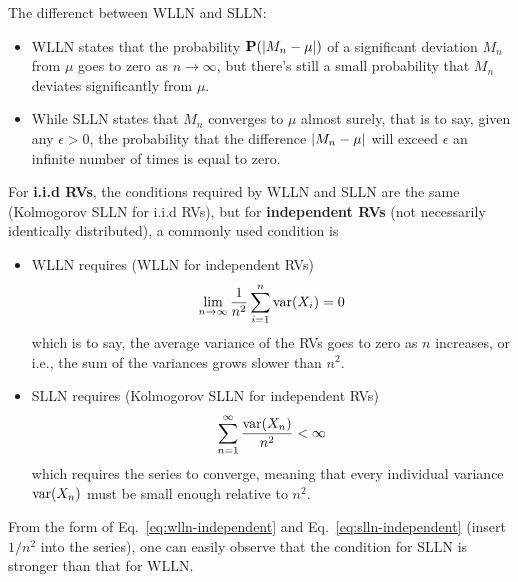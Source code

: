 \begin{remark}
    The differenct between WLLN and SLLN:
    \begin{itemize}
        \item WLLN states that the probability $\mathbf{P}(\abs{M_n - \mu})$ of a significant deviation $M_n$ from $\mu$ goes to zero as $n \to \infty$, but there's still a small probability that $M_n$ deviates significantly from $\mu$.
        \item While SLLN states that $M_n$ converges to $\mu$ almost surely, that is to say, given any $\epsilon > 0$, the probability that the difference $\abs{M_n - \mu}$ will exceed $\epsilon$ an infinite number of times is equal to zero.
    \end{itemize}
\end{remark}
\begin{remark}
    For \textbf{i.i.d RVs}, the conditions required by WLLN and SLLN are the same (Kolmogorov SLLN for i.i.d RVs), but for \textbf{independent RVs} (not necessarily identically distributed), a commonly used condition is
    \begin{itemize}
        \item WLLN requires (WLLN for independent RVs)
        \begin{equation}
            \label{eq:wlln-independent}
            \lim_{n \to \infty} \frac{1}{n^2} \sum_{i=1}^{n} \mathrm{var}(X_i) = 0
        \end{equation}
        which is to say, the average variance of the RVs goes to zero as $n$ increases, or i.e., the sum of the variances grows slower than $n^2$.
        \item SLLN requires (Kolmogorov SLLN for independent RVs)
        \begin{equation}
            \label{eq:slln-independent}
            \sum_{n=1}^{\infty} \frac{\mathrm{var}(X_n)}{n^2} < \infty
        \end{equation}
        which requires the series to converge, meaning that every individual variance $\mathrm{var}(X_n)$ must be small enough relative to $n^2$.
    \end{itemize}
    From the form of Eq.~\ref{eq:wlln-independent} and Eq.~\ref{eq:slln-independent} (insert $1/n^2$ into the series), one can easily observe that the condition for SLLN is stronger than that for WLLN.
\end{remark}
